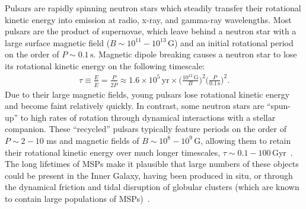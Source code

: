 Pulsars are rapidly spinning neutron stars which steadily transfer their rotational kinetic energy into emission at radio, x-ray, and gamma-ray wavelengths. Most pulsars are the product of supernovae, which leave behind a neutron star with a large surface magnetic field ($B\sim 10^{11}-10^{13} \, \textrm{G}$) and an initial rotational period on the order of $P \sim 0.1 \, \textrm{s}$. Magnetic dipole breaking causes a neutron star to lose its rotational kinetic energy on the following timescale:
%
\begin{align}
\tau \equiv \frac{E}{\dot{E}} = \frac{P}{2\dot{P}} \approx 1.6 \times 10^5 \, \textrm{yr} \times \bigg(\frac{10^{12} \, \textrm{G}}{B}\bigg)^2 \bigg(\frac{P}{0.1 \, \textrm{s}}\bigg)^2.
\end{align}
%
Due to their large magnetic fields, young pulsars lose rotational kinetic energy and become faint relatively quickly. In contrast, some neutron stars are ``spun-up'' to high rates of rotation through dynamical interactions with a stellar companion. These ``recycled'' pulsars typically feature periods on the order of $P\sim 2-10$ ms and magnetic fields of $B\sim 10^8-10^9 \, \textrm{G}$, allowing them to retain their rotational kinetic energy over much longer timescales, \mbox{$\tau \sim 0.1-100 \, \textrm{Gyr}$~\cite{1982Natur.300..728A,Lorimer:2001vd,Phinney:1994gf,Lorimer:2008se,Kiziltan:2009rx}.} The long lifetimes of MSPs make it plausible that large numbers of these objects could be present in the Inner Galaxy, having been produced in situ, or through the dynamical friction and tidal disruption of globular clusters (which are known to contain large populations of MSPs)~\cite{Brandt:2015ula,Fragione:2017rsp,Gnedin:2013cda}. 


